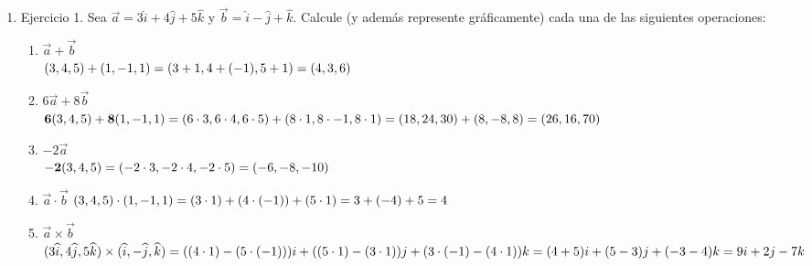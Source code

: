\documentclass[10pt,letterpaper,fleqn]{article}
\begin{document}
    \begin{enumerate}

        \item Ejercicio 1. Sea $\overrightarrow{a} = 3\widehat{i} + 4\widehat{j}
        + 5\widehat{k}$ y $\overrightarrow{b} = \widehat{i} - \widehat{j} +
        \widehat{k}$. Calcule (y además represente gráficamente) cada una de las
        siguientes operaciones:
        \begin{enumerate}
          \item $\overrightarrow{a} + \overrightarrow{b}$ \\
            $ (3,4,5) + (1,-1,1) \\
              =(3+1,4+(-1),5+1) \\
              =(4,3,6)
            $
            \\
          \item $6 \overrightarrow{a} + 8 \overrightarrow{b}$ \\
            $
              {\bf 6}(3,4,5) + {\bf 8}(1,-1,1) \\
              = (6 \cdot 3, 6 \cdot 4, 6 \cdot 5) + (8 \cdot 1, 8 \cdot -1,
              8 \cdot 1) \\
              = (18,24,30) + (8,-8,8) \\
              = (26,16,70)
            $
            \\
          \item $-2 \overrightarrow{a}$ \\
            $
              {\bf -2}(3,4,5) \\
              = (-2\cdot 3, -2\cdot 4, -2\cdot 5) \\
              = (-6,-8,-10)
            $
            \\
          \item $\overrightarrow{a} \cdot \overrightarrow{b}$
            $
              (3,4,5) \cdot (1,-1,1) \\
              = (3 \cdot 1) + (4 \cdot (-1)) + (5 \cdot 1) \\
              = 3 + (-4) + 5 \\
              = 4
            $
            \\
          \item $\overrightarrow{a} \times \overrightarrow{b}$
            $
            (3\widehat{i}, 4\widehat{j}, 5\widehat{k}) \times
            (\widehat{i}, -\widehat{j},\widehat{k}) \\
            = ((4\cdot 1) - (5\cdot(-1)))i + ((5\cdot 1) - (3\cdot 1))j +
            (3\cdot(-1) - (4\cdot 1))k \\
            = (4+5)i + (5-3)j + (-3-4)k \\
            = 9i + 2j -7k
            $
            \\
        \end{enumerate}


\end{enumerate}
\end{document}
